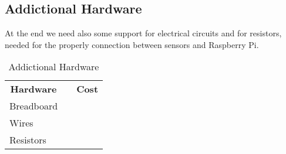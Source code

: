 \subsection{Addictional Hardware}

At the end we need also some support for electrical circuits and for resistors, needed for the properly connection between sensors and Raspberry Pi.

\begin{table}[]
\centering
\begin{tabular}{lll}
\multicolumn{1}{c}{\textbf{Hardware}} &  & \multicolumn{1}{c}{\textbf{Cost}} \\
Breadboard                            &  &                                   \\
Wires                                 &  &                                   \\
Resistors                             &  &                                  
\end{tabular}
\caption{Addictional Hardware}
\label{Addictional Hardware}
\end{table}
